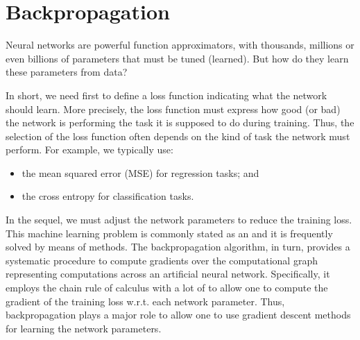 \documentclass[letterpaper,10pt,english]{jupyterBook}
\begin{document}
\sphinxstepscope


\section{Backpropagation}
\label{\detokenize{neuralnets_backprop:backpropagation}}\label{\detokenize{neuralnets_backprop::doc}}
\sphinxAtStartPar
Neural networks are powerful function approximators, with thousands, millions or even billions of parameters that must be tuned (learned). But how do they learn these parameters from data?

\sphinxAtStartPar
In short, we need first to define a loss function indicating what the network should learn. More precisely, the loss function must express how good (or bad) the network is performing the task it is supposed to do during training. Thus, the selection of the loss function often depends on the kind of task the network must perform. For example, we typically use:
\begin{itemize}
\item {} 
\sphinxAtStartPar
the mean squared error (MSE) for regression tasks; and

\item {} 
\sphinxAtStartPar
the cross entropy for classification tasks.

\end{itemize}

\sphinxAtStartPar
In the sequel, we must adjust the network parameters to reduce the training loss. This machine learning problem is commonly stated as an  and it is frequently solved by means of  methods. The backpropagation algorithm, in turn, provides a systematic procedure to compute gradients over the computational graph representing computations across an artificial neural network. Specifically, it employs the chain rule of calculus with a lot of  to allow one to compute the gradient of the training loss w.r.t. each network parameter. Thus, backpropagation plays a major role to allow one to use gradient descent methods for learning the network parameters.
\end{document}
